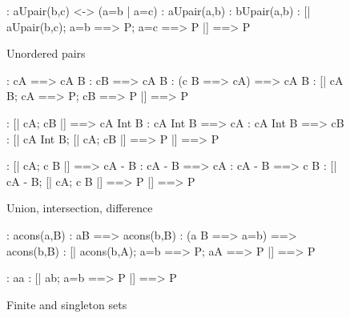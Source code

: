 
\begin{figure}
\begin{alltt*}\isastyleminor
{}:   a\isasymin{}Upair(b,c) <-> (a=b | a=c)
:   a\isasymin{}Upair(a,b)
:   b\isasymin{}Upair(a,b)
:    [| a\isasymin{}Upair(b,c);  a=b ==> P;  a=c ==> P |] ==> P
\end{alltt*}
\caption{Unordered pairs} \label{zf-upair1}
\end{figure}


\begin{figure}
\begin{alltt*}\isastyleminor
{}:      c\isasymin{}A ==> c\isasymin{}A \isasymunion B
:      c\isasymin{}B ==> c\isasymin{}A \isasymunion B
:      (c \isasymnotin B ==> c\isasymin{}A) ==> c\isasymin{}A \isasymunion B
:       [| c\isasymin{}A \isasymunion B;  c\isasymin{}A ==> P;  c\isasymin{}B ==> P |] ==> P

:      [| c\isasymin{}A;  c\isasymin{}B |] ==> c\isasymin{}A Int B
:     c\isasymin{}A Int B ==> c\isasymin{}A
:     c\isasymin{}A Int B ==> c\isasymin{}B
:      [| c\isasymin{}A Int B;  [| c\isasymin{}A; c\isasymin{}B |] ==> P |] ==> P

:     [| c\isasymin{}A;  c \isasymnotin B |] ==> c\isasymin{}A - B
:    c\isasymin{}A - B ==> c\isasymin{}A
:    c\isasymin{}A - B ==> c  \isasymnotin  B
:     [| c\isasymin{}A - B;  [| c\isasymin{}A; c \isasymnotin B |] ==> P |] ==> P
\end{alltt*}
\caption{Union, intersection, difference} \label{zf-Un}
\end{figure}


\begin{figure}
\begin{alltt*}\isastyleminor
{}:    a\isasymin{}cons(a,B)
:    a\isasymin{}B ==> a\isasymin{}cons(b,B)
:    (a \isasymnotin B ==> a=b) ==> a\isasymin{}cons(b,B)
:     [| a\isasymin{}cons(b,A);  a=b ==> P;  a\isasymin{}A ==> P |] ==> P

:  a\isasymin{}{\ttlbrace}a{\ttrbrace}
:  [| a\isasymin{}{\ttlbrace}b{\ttrbrace}; a=b ==> P |] ==> P
\end{alltt*}
\caption{Finite and singleton sets} \label{zf-upair2}
\end{figure}


